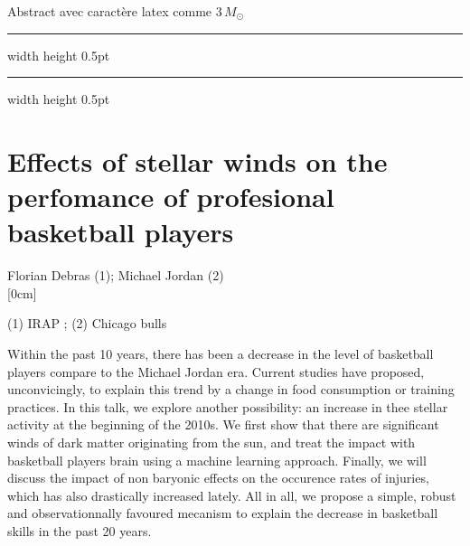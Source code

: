 \documentclass[a4paper,11pt]{book}
\def\doubleline{
\hrule width \hsize height 0.5pt  \kern 1mm \hrule width \hsize height 0.5pt 
}
\begin{document}
  
\vspace{2 mm}
\noindent Abstract avec caractère latex comme $3\,M_{\odot}$

\noindent\doubleline
        
          \section[Effects of stellar winds on the perfomance of profesional basketball players \newline(Florian Debras)] { Effects of stellar winds on the perfomance of profesional basketball players }



\begin{center}
{\large Florian Debras  (1)};{ \large  Michael Jordan (2)}\\



[0cm]



  
\vspace{2 mm}
\noindent (1) IRAP ; (2)  Chicago bulls\\

\end{center}



  
\vspace{2 mm}
\noindent Within the past 10 years, there has been a decrease in the level of basketball players compare to the Michael Jordan era. Current studies have proposed, unconvicingly, to explain this trend by a change in food consumption or training practices. In this talk, we explore another possibility: an increase in thee stellar activity at the beginning of the 2010s. We first show that there are significant winds of dark matter originating from the sun, and treat the impact with basketball players brain using a machine learning approach. Finally, we will discuss the impact of non baryonic effects on the occurence rates of injuries, which has also drastically increased lately. All in all, we propose a simple, robust and observationnally favoured mecanism to explain the decrease in basketball skills in the past 20 years.
\end{document}
